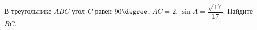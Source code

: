 \begin{ex}
	\begin{condition}
		В треугольнике \( ABC \) угол \( C \) равен \( 90 \degree \), \( AC=2 \),  \( \sin A=\dfrac{\sqrt{17}}{17} \). Найдите \( BC \).
	\end{condition}
\end{ex}